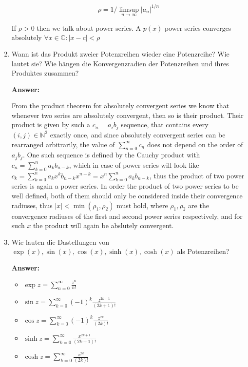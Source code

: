 \documentclass[11pt]{article}
\newcommand{\abs}[1]{\left|#1\right|}
\newcommand{\sumn}[4]{\sum_{#1=#2}^{#3}{#4}}
\newcommand{\CC}[0]{\mathbb{C}}
\newcommand{\NN}[0]{\mathbb{N}}
\begin{document}
\begin{enumerate}
    $$\rho = 1/\limsup_{n\to\infty}\abs{a_n}^{1/n}$$

    If $\rho >0$ then we talk about power series. A $p(x)$ power series converges absolutely $\forall x\in\CC\colon \abs{x - c} < \rho$

    \item  Wann ist das Produkt zweier Potenzreihen wieder eine Potenzreihe? Wie lautet sie? Wie hängen die Konvergenzradien der Potenzreihen und ihres Produktes zusammen?
    
    \textbf{Answer:}

    From the product theorem for absolutely convergent series we know that whenever two series are absolutely convergent, then so is their product. Their product is given by such a $c_n = a_i b_j$ sequence, that contains every $(i, j) \in \NN^2$ exactly once, and since absolutely convergent series can be rearranged arbitrarily, the value of $\sumn{n}{0}{\infty}{c_n}$ does not depend on the order of $a_j b_j$. One such sequence is defined by the Cauchy product with $c_n = \sumn{k}{0}{n}{a_k b_{n-k}}$, which in case of power series will look like $c_k = \sumn{k}{0}{n}{a_k x^k b_{n-k} x^{n-k}} = x^n \sumn{k}{0}{n}{a_k b_{n-k}}$, thus the product of two power series is again a power series. In order the product of two power series to be well defined, both of them should only be considered inside their convergence radiuses, thus $\abs{x} < \min(\rho_1, \rho_2)$ must hold, where $\rho_1, \rho_2$ are the convergence radiuses of the first and second power series respectively, and for such $x$ the product will again be abslutely convergent.



    \item  Wie lauten die Dastellungen von $\exp(x), \sin(x), \cos(x), \sinh(x), \cosh(x)$ als Potenzreihen?
    
    \textbf{Answer:}
    \begin{itemize}
        \item $\exp{z} = \sumn{n}{0}{\infty}{\frac{z^n}{n!}}$
        \item $\sin{z} = \sumn{k}{0}{\infty}{(-1)^k\frac{z^{2k+1}}{(2k+1)!}}$
        \item $\cos{z} = \sumn{k}{0}{\infty}{(-1)^k\frac{z^{2k}}{(2k)!}}$
        \item $\sinh{z} = \sumn{k}{0}{\infty}{\frac{x^{2k+1}}{(2k+1)!}}$
        \item $\cosh{z} = \sumn{k}{0}{\infty}{\frac{x^{2k}}{(2k)!}}$
    \end{itemize}


\end{enumerate}
\end{document}
